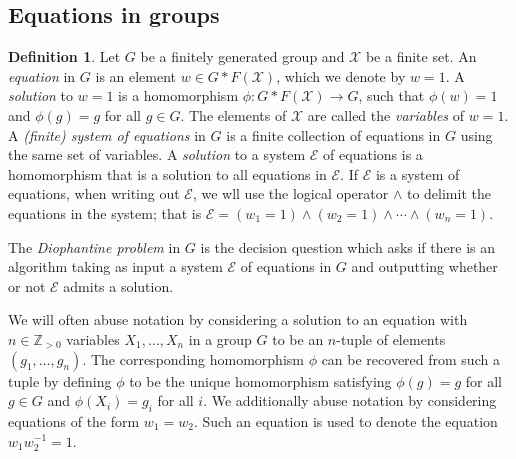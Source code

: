 \documentclass[11pt]{amsart}
\theoremstyle{definition}
\newtheorem{dfn}[theorem]{Definition}
\numberwithin{theorem}{section}
\begin{document}
\subsection{Equations in groups}

    \begin{dfn}
		Let \(G\) be a finitely generated group and \(\mathcal X\) be a
		finite set. An \emph{equation} in \(G\) is an element \(w \in G
		\ast F(\mathcal X)\), which we denote by \(w = 1\). A
		\emph{solution} to \(w = 1\) is a homomorphism \(\phi \colon G \ast
		F(\mathcal X) \to G\), such that \(\phi(w)  = 1\) and \(\phi (g)=
		g\) for all \(g \in G\).  The elements of \(\mathcal X\) are called
		the \emph{variables} of \(w = 1\). A \emph{(finite) system of
		equations} in \(G\) is a finite collection of equations in \(G\)
		using the same set of variables. A \emph{solution} to a system
		\(\mathcal E\) of equations is a homomorphism that is a solution to
		all equations in \(\mathcal E\). If \(\mathcal E\) is a system of
		equations, when writing out \(\mathcal E\), we wll use the logical
		operator \(\wedge\) to delimit the equations in the system; that is
		\(\mathcal E = (w_1 = 1) \wedge (w_2 = 1) \wedge \cdots \wedge (w_n
		= 1)\).

	    The \emph{Diophantine problem} in \(G\) is the decision question which asks if
	    there is an algorithm taking as input a system \(\mathcal E\) of equations in \(G\)
	    and outputting whether or not \(\mathcal E\) admits a solution. 
	\end{dfn}

		We will often abuse notation by considering a solution to an equation
		with \(n \in \mathbb{Z}_{>0}\) variables \(X_1, \ldots, X_n\) in a
		group \(G\) to be an \(n\)-tuple of elements \((g_1,  \ldots,  g_n)\).
		The corresponding homomorphism \(\phi\) can be recovered from such a
		tuple by defining \(\phi\) to be the unique homomorphism satisfying
		\(\phi(g)  = g\) for all \(g \in G\) and \(\phi(X_i) = g_i\) for all
		\(i\). We additionally abuse notation by considering equations of the
		form \(w_1 = w_2\). Such an equation is used to denote the equation
		\(w_1w_2^{-1} = 1\).
\end{document}
